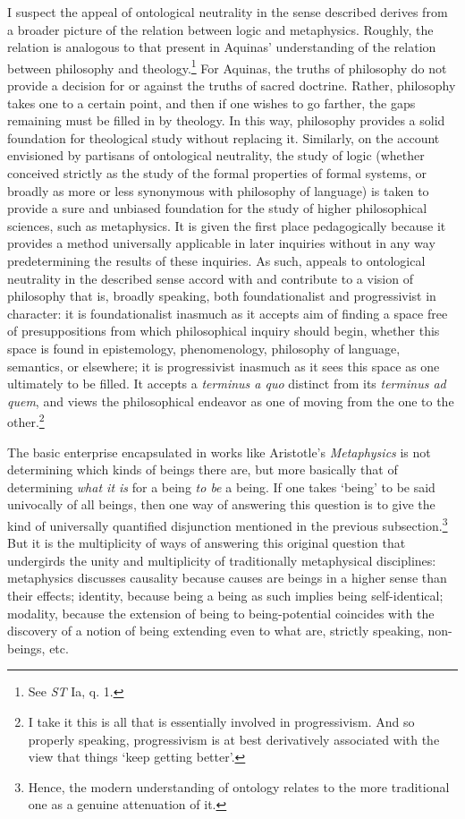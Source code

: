 \documentclass[]{article}
\begin{document}
I suspect the appeal of ontological neutrality in the sense described derives from a broader picture of the relation between logic and metaphysics. Roughly, the relation is analogous to that present in Aquinas' understanding of the relation between philosophy and theology.\footnote{See \textit{ST} Ia, q. 1.} For Aquinas, the truths of philosophy do not provide a decision for or against the truths of sacred doctrine. Rather, philosophy takes one to a certain point, and then if one wishes to go farther, the gaps remaining must be filled in by theology. In this way, philosophy provides a solid foundation for theological study without replacing it. Similarly, on the account envisioned by partisans of ontological neutrality, the study of logic (whether conceived strictly as the study of the formal properties of formal systems, or broadly as more or less synonymous with philosophy of language) is taken to provide a sure and unbiased foundation for the study of higher philosophical sciences, such as metaphysics. It is given the first place pedagogically because it provides a method universally applicable in later inquiries without in any way predetermining the results of these inquiries. As such, appeals to ontological neutrality in the described sense accord with and contribute to a vision of philosophy that is, broadly speaking, both foundationalist and progressivist in character: it is foundationalist inasmuch as it accepts aim of finding a space free of presuppositions from which philosophical inquiry should begin, whether this space is found in epistemology, phenomenology, philosophy of language, semantics, or elsewhere; it is progressivist inasmuch as it sees this space as one ultimately to be filled. It accepts a \textit{terminus a quo} distinct from its \textit{terminus ad quem}, and views the philosophical endeavor as one of moving from the one to the other.\footnote{I take it this is all that is essentially involved in progressivism. And so properly speaking, progressivism is at best derivatively associated with the view that things `keep getting better'.}

The basic enterprise encapsulated in works like Aristotle's \textit{Metaphysics} is not determining which kinds of beings there are, but more basically that of determining \textit{what it is} for a being \textit{to be} a being. If one takes `being' to be said univocally of all beings, then one way of answering this question is to give the kind of universally quantified disjunction mentioned in the previous subsection.\footnote{Hence, the modern understanding of ontology relates to the more traditional one as a genuine attenuation of it.} But it is the multiplicity of ways of answering this original question that undergirds the unity and multiplicity of traditionally metaphysical disciplines: metaphysics discusses causality because causes are beings in a higher sense than their effects; identity, because being a being as such implies being self-identical; modality, because the extension of being to being-potential coincides with the discovery of a notion of being extending even to what are, strictly speaking, non-beings, etc.
\end{document}
